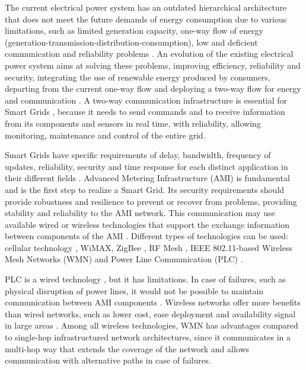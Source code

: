 \documentclass[conference]{IEEEtran}
\begin{document}
The current electrical power system has an outdated hierarchical architecture that does not meet the future demands of energy consumption due to various limitations, such as limited generation capacity, one-way flow of energy (generation-transmission-distribution-consumption), low and deficient communication and reliability problems \cite{Farhangi2010}. 
An evolution of the existing electrical power system aims at solving these problems, improving efficiency, reliability and security, integrating the use of renewable energy produced by consumers, departing from the current one-way flow and deploying a two-way flow for energy and communication \cite {Farhangi2010,Moslehi2010}. A two-way communication infrastructure is essential for Smart Grids \cite{Gungor2011}, because it needs to send commands and to receive information from its components and sensors  in real time, with reliability, allowing monitoring, maintenance and control of the entire grid. 

Smart Grids have specific requirements of delay, bandwidth, frequency of updates, reliability, security and time response for each distinct application in their different fields \cite{Gungor2011}. Advanced Metering Infrastructure (AMI) is fundamental and is the first step to realize a Smart Grid\cite{4781067,5484223}. Its security requirements should provide robustness and resilience to prevent or recover from problems, providing stability and reliability to the AMI network. This communication may use available wired or wireless technologies that support the exchange information between components of the AMI \cite{Saputro2012,4547164}. Different types of technologies can be used: cellular technology \cite{5589988}, WiMAX, ZigBee \cite{5589988}, RF Mesh \cite{5622071}, IEEE 802.11-based Wireless Mesh Networks (WMN) and Power Line Communication (PLC) \cite{5479945}. 

PLC is a wired technology \cite{Saputro2012}, but it has limitations. In case of failures, such as physical disruption of power lines, it would not be possible to maintain communication between AMI components \cite{Gungor2006}. Wireless networks offer more benefits than wired networks, such as lower cost, ease deployment and availability signal in large areas \cite{5589988}. Among all wireless technologies, WMN has advantages compared to single-hop infrastructured network architectures, since it communicates in a multi-hop way that extends the coverage of the network and allows communication with alternative paths in case of failures\cite{5622071,Fang2012}. 
\end{document}
